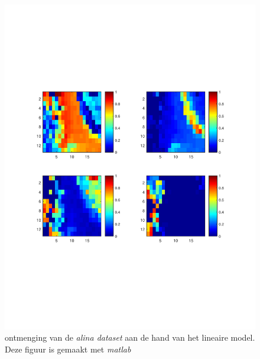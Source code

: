\documentclass[12pt]{report}
\begin{document}
\begin{figure}
\includegraphics[width=0.99\linewidth,trim=0 200 0 175 cm]{linMESMA.pdf}
\caption{ontmenging van de \textit{alina dataset}\cite{alina} aan de hand van het lineaire model. Deze figuur is gemaakt met \textit{matlab}\cite{MATLAB} \label{fig:al}}
\end{figure}


\begin{appendices}




\end{appendices}


\begin{flushleft}
\nocite{*}
{}


\end{flushleft}
\end{document}

